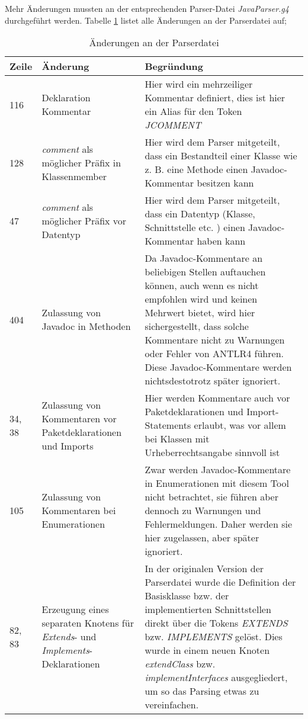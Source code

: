 Mehr Änderungen mussten an der entsprechenden Parser-Datei \textit{JavaParser.g4} durchgeführt werden.  Tabelle \ref{tab:parser_changes} listet alle Änderungen an der Parserdatei auf;
\begin{table}[h]
    \centering
    \begin{tabular}{m{0.75cm}|m{4cm}|m{10cm}}
        Zeile & Änderung & Begründung \\
         \hline
        116 & Deklaration Kommentar & Hier wird ein mehrzeiliger Kommentar definiert, dies ist hier ein Alias für den Token \textit{JCOMMENT}\\
        \hline
        128 & \textit{comment} als möglicher Präfix in Klassenmember & Hier wird dem Parser mitgeteilt, dass ein Bestandteil einer Klasse wie z. B. eine Methode einen Javadoc-Kommentar besitzen kann\\
        \hline
        47 & \textit{comment} als möglicher Präfix vor Datentyp & Hier wird dem Parser mitgeteilt, dass ein Datentyp (Klasse, Schnittstelle etc. ) einen Javadoc-Kommentar haben kann \\
        \hline
        404 & Zulassung von Javadoc in Methoden & Da Javadoc-Kommentare an beliebigen Stellen auftauchen können, auch wenn es nicht empfohlen wird und keinen Mehrwert bietet, wird hier sichergestellt, dass solche Kommentare nicht zu Warnungen oder Fehler von ANTLR4 führen. Diese Javadoc-Kommentare werden nichtsdestotrotz später ignoriert.\\
        \hline
        34, 38& Zulassung von Kommentaren vor Paketdeklarationen und Imports & Hier werden Kommentare auch vor Paketdeklarationen und Import-Statements erlaubt, was vor allem bei Klassen mit Urheberrechtsangabe sinnvoll ist\\
        \hline
        105 & Zulassung von Kommentaren bei Enumerationen & Zwar werden Javadoc-Kommentare in Enumerationen mit diesem Tool nicht betrachtet, sie führen aber dennoch zu Warnungen und Fehlermeldungen. Daher werden sie hier zugelassen, aber später ignoriert. \\
        \hline
        82, 83 & Erzeugung eines separaten Knotens für \textit{Extends}- und \textit{Implements}-Deklarationen & In der originalen Version der Parserdatei wurde die Definition der Basisklasse bzw. der implementierten Schnittstellen direkt über die Tokens \textit{EXTENDS} bzw. \textit{IMPLEMENTS} gelöst. Dies wurde in einem neuen Knoten \textit{extendClass} bzw. \textit{implementInterfaces} ausgegliedert, um so das Parsing etwas zu vereinfachen.  \\
         \hline
    \end{tabular}
    \caption{Änderungen an der Parserdatei}
    \label{tab:parser_changes}
\end{table}

